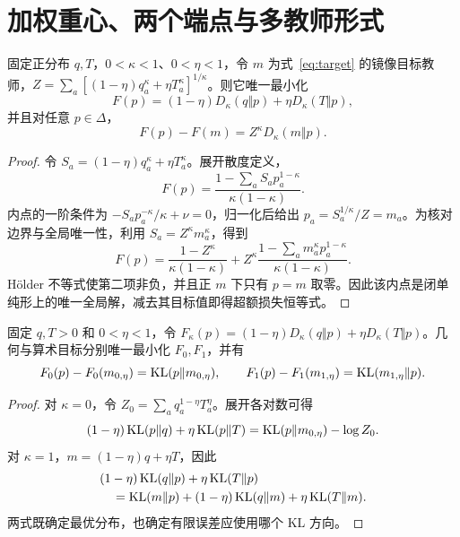 \section{加权重心、两个端点与多教师形式}
\begin{theorem}[镜像教师的幂散度重心解释]
\label{thm:barycenter}
固定正分布 $q,T$，$0<\kappa<1$、$0<\eta<1$，令 $m$ 为式~\eqref{eq:target} 的镜像目标教师，$Z=\sum_a[(1-\eta)q_a^\kappa+\eta T_a^\kappa]^{1/\kappa}$。则它唯一最小化
\begin{equation}
F(p)=(1-\eta)D_\kappa(q\Vert p)+\eta D_\kappa(T\Vert p),
\end{equation}
并且对任意 $p\in\Delta$，
\begin{equation}
F(p)-F(m)=Z^\kappa D_\kappa(m\Vert p).
\end{equation}
\end{theorem}
\begin{proof}
令 $S_a=(1-\eta)q_a^\kappa+\eta T_a^\kappa$。展开散度定义，
\begin{equation}
F(p)=\frac{1-\sum_aS_ap_a^{1-\kappa}}{\kappa(1-\kappa)}.
\end{equation}
内点的一阶条件为 $-S_ap_a^{-\kappa}/\kappa+\nu=0$，归一化后给出 $p_a=S_a^{1/\kappa}/Z=m_a$。为核对边界与全局唯一性，利用 $S_a=Z^\kappa m_a^\kappa$，得到
\begin{equation}
F(p)=\frac{1-Z^\kappa}{\kappa(1-\kappa)}
+Z^\kappa\frac{1-\sum_am_a^\kappa p_a^{1-\kappa}}{\kappa(1-\kappa)}.
\end{equation}
Hölder 不等式使第二项非负，并且正 $m$ 下只有 $p=m$ 取零。因此该内点是闭单纯形上的唯一全局解，减去其目标值即得超额损失恒等式。
\end{proof}

\begin{proposition}[KL 两端的重心误差分解]
固定 $q,T>0$ 和 $0<\eta<1$，令 $F_\kappa(p)=(1-\eta)D_\kappa(q\Vert p)+\eta D_\kappa(T\Vert p)$。几何与算术目标分别唯一最小化 $F_0,F_1$，并有
\begin{equation}
F_0(p)-F_0(m_{0,\eta})=\operatorname{KL}(p\Vert m_{0,\eta}),\qquad
F_1(p)-F_1(m_{1,\eta})=\operatorname{KL}(m_{1,\eta}\Vert p).
\end{equation}
\end{proposition}
\begin{proof}
对 $\kappa=0$，令 $Z_0=\sum_aq_a^{1-\eta}T_a^\eta$。展开各对数可得
\begin{equation}
(1-\eta)\operatorname{KL}(p\Vert q)+\eta\operatorname{KL}(p\Vert T)
=\operatorname{KL}(p\Vert m_{0,\eta})-\log Z_0.
\end{equation}
对 $\kappa=1$，$m=(1-\eta)q+\eta T$，因此
\begin{align}
&(1-\eta)\operatorname{KL}(q\Vert p)+\eta\operatorname{KL}(T\Vert p)\\
&\quad=\operatorname{KL}(m\Vert p)+(1-\eta)\operatorname{KL}(q\Vert m)+\eta\operatorname{KL}(T\Vert m).
\end{align}
两式既确定最优分布，也确定有限误差应使用哪个 KL 方向。
\end{proof}

